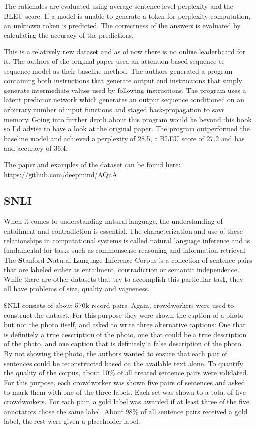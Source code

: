 \documentclass[]{krantz}
\begin{document}
The rationales are evaluated using average sentence level perplexity and the BLEU score. If a model is unable to generate a token for perplexity computation, an unknown token is predicted. The correctness of the answers is evaluated by calculating the accuracy of the predictions.

This is a relatively new dataset and as of now there is no online leaderboard for it. The authors of the original paper used an attention-based sequence to sequence model as their baseline method. The authors generated a program containing both instructions that generate output and instructions that simply generate intermediate values used by following instructions. The program uses a latent predictor network which generates an output sequence conditioned on an arbitrary number of input functions and staged back-propagation to save memory. Going into further depth about this program would be beyond this book so I'd advise to have a look at the original paper.
The program outperformed the baseline model and achieved a perplexity of 28.5, a BLEU score of 27.2 and has and accuracy of 36.4. \citep{ling2017program}

The paper and examples of the dataset can be found here:
\center \url{https://github.com/deepmind/AQuA}

\flushleft

\hypertarget{snli}{%
\subsection{SNLI}\label{snli}}

When it comes to understanding natural language, the understanding of entailment and contradiction is essential. The characterization and use of these relationships in computational systems is called natural language inference and is fundamental for tasks such as commonsense reasoning and information retrieval. The \textbf{S}tanford \textbf{N}atural \textbf{L}anguage \textbf{I}nference Corpus is a collection of sentence pairs that are labeled either as entailment, contradiction or semantic independence.
While there are other datasets that try to accomplish this particular task, they all have problems of size, quality and vagueness.

SNLI consists of about 570k record pairs. Again, crowdworkers were used to construct the dataset. For this purpose they were shown the caption of a photo but not the photo itself, and asked to write three alternative captions: One that is definitely a true description of the photo, one that could be a true description of the photo, and one caption that is definitely a false description of the photo. By not showing the photo, the authors wanted to ensure that each pair of sentences could be reconstructed based on the available text alone.
To quantify the quality of the corpus, about 10\% of all created sentence pairs were validated. For this purpose, each crowdworker was shown five pairs of sentences and asked to mark them with one of the three labels. Each set was shown to a total of five crowdworkers. For each pair, a gold label was awarded if at least three of the five annotators chose the same label. About 98\% of all sentence pairs received a gold label, the rest were given a placeholder label. \citep{bowman2015large}
\end{document}
